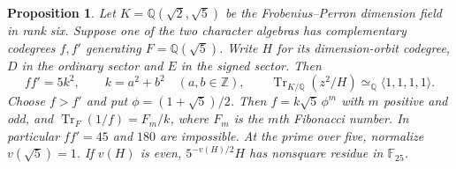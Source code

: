 \documentclass[11pt,reqno]{amsart}
\newtheorem{proposition}[theorem]{Proposition}
\theoremstyle{remark}\newtheorem{remark}[theorem]{Remark}
\numberwithin{equation}{section}
\begin{document}
\begin{proposition}\label{prop:forty-trace-form}
Let $K=\mathbb Q(\sqrt2,\sqrt5)$ be the Frobenius--Perron dimension
field in rank six. Suppose one of the two character algebras has
complementary codegrees $f,f'$ generating $F=\mathbb Q(\sqrt5)$.
Write $H$ for its dimension-orbit codegree, $D$ in the ordinary sector
and $E$ in the signed sector. Then
\[
  ff'=5k^2,\qquad k=a^2+b^2\quad(a,b\in\mathbb Z),\qquad
  \operatorname{Tr}_{K/\mathbb Q}(z^2/H)\simeq_{\mathbb Q}
  \langle1,1,1,1\rangle .
\]
Choose $f>f'$ and put $\phi=(1+\sqrt5)/2$.
Then $f=k\sqrt5\,\phi^m$ with $m$ positive and odd, and
$\operatorname{Tr}_F(1/f)=F_m/k$, where $F_m$ is the $m$th
Fibonacci number. In particular $ff'=45$ and $180$ are impossible.
At the prime over five, normalize $v(\sqrt5)=1$. If $v(H)$ is even,
$5^{-v(H)/2}H$ has nonsquare residue in $\mathbb F_{25}$.
\end{proposition}
\end{document}
